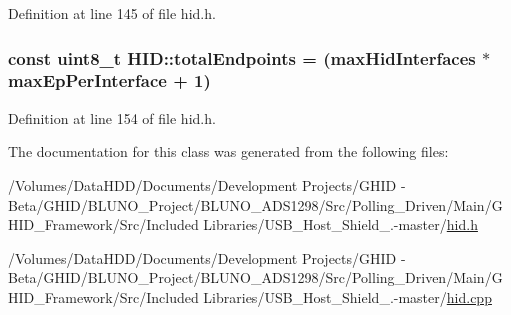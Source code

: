 \-Definition at line 145 of file hid.\-h.

\hypertarget{class_h_i_d_a884aa67312324e7d23a052a6dc80337e}{
\subsubsection[{total\-Endpoints}]{\setlength{\rightskip}{0pt plus 5cm}const uint8\-\_\-t {\bf \-H\-I\-D\-::total\-Endpoints} = ({\bf max\-Hid\-Interfaces} $\ast$ {\bf max\-Ep\-Per\-Interface} + 1)}}\label{class_h_i_d_a884aa67312324e7d23a052a6dc80337e}


\-Definition at line 154 of file hid.\-h.



\-The documentation for this class was generated from the following files\-:\begin{DoxyCompactItemize}
\item 
/\-Volumes/\-Data\-H\-D\-D/\-Documents/\-Development Projects/\-G\-H\-I\-D -\/ Beta/\-G\-H\-I\-D/\-B\-L\-U\-N\-O\-\_\-\-Project/\-B\-L\-U\-N\-O\-\_\-\-A\-D\-S1298/\-Src/\-Polling\-\_\-\-Driven/\-Main/\-G\-H\-I\-D\-\_\-\-Framework/\-Src/\-Included Libraries/\-U\-S\-B\-\_\-\-Host\-\_\-\-Shield\-\_.-\/master/\hyperlink{hid_8h}{hid.\-h}\item 
/\-Volumes/\-Data\-H\-D\-D/\-Documents/\-Development Projects/\-G\-H\-I\-D -\/ Beta/\-G\-H\-I\-D/\-B\-L\-U\-N\-O\-\_\-\-Project/\-B\-L\-U\-N\-O\-\_\-\-A\-D\-S1298/\-Src/\-Polling\-\_\-\-Driven/\-Main/\-G\-H\-I\-D\-\_\-\-Framework/\-Src/\-Included Libraries/\-U\-S\-B\-\_\-\-Host\-\_\-\-Shield\-\_.-\/master/\hyperlink{hid_8cpp}{hid.\-cpp}\end{DoxyCompactItemize}
